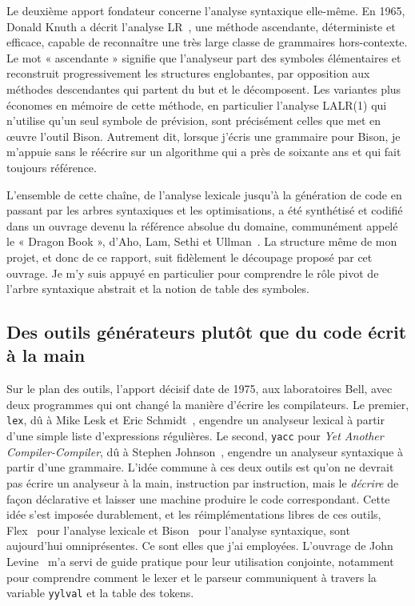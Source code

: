 Le deuxième apport fondateur concerne l'analyse syntaxique elle-même. En 1965,
Donald Knuth a décrit l'analyse LR~\cite{knuth}, une méthode ascendante,
déterministe et efficace, capable de reconnaître une très large classe de
grammaires hors-contexte. Le mot « ascendante » signifie que l'analyseur part des
symboles élémentaires et reconstruit progressivement les structures
englobantes, par opposition aux méthodes descendantes qui partent du but et le
décomposent. Les variantes plus économes en mémoire de cette méthode, en
particulier l'analyse LALR(1) qui n'utilise qu'un seul symbole de prévision, sont
précisément celles que met en \oe uvre l'outil Bison. Autrement dit, lorsque
j'écris une grammaire pour Bison, je m'appuie sans le réécrire sur un algorithme
qui a près de soixante ans et qui fait toujours référence.

L'ensemble de cette chaîne, de l'analyse lexicale jusqu'à la génération de code en
passant par les arbres syntaxiques et les optimisations, a été synthétisé et
codifié dans un ouvrage devenu la référence absolue du domaine, communément appelé
le « Dragon Book », d'Aho, Lam, Sethi et Ullman~\cite{dragon}. La structure même
de mon projet, et donc de ce rapport, suit fidèlement le découpage proposé par cet
ouvrage. Je m'y suis appuyé en particulier pour comprendre le rôle pivot de
l'arbre syntaxique abstrait et la notion de table des symboles.

\subsection{Des outils générateurs plutôt que du code écrit à la main}

Sur le plan des outils, l'apport décisif date de 1975, aux laboratoires Bell, avec
deux programmes qui ont changé la manière d'écrire les compilateurs. Le premier,
\texttt{lex}, dû à Mike Lesk et Eric Schmidt~\cite{lesk}, engendre un analyseur
lexical à partir d'une simple liste d'expressions régulières. Le second,
\texttt{yacc} pour \emph{Yet Another Compiler-Compiler}, dû à Stephen
Johnson~\cite{johnson}, engendre un analyseur syntaxique à partir d'une grammaire.
L'idée commune à ces deux outils est qu'on ne devrait pas écrire un analyseur à la
main, instruction par instruction, mais le \emph{décrire} de façon déclarative et
laisser une machine produire le code correspondant. Cette idée s'est imposée
durablement, et les réimplémentations libres de ces outils, Flex~\cite{flex} pour
l'analyse lexicale et Bison~\cite{bison} pour l'analyse syntaxique, sont
aujourd'hui omniprésentes. Ce sont elles que j'ai employées. L'ouvrage de John
Levine~\cite{levine} m'a servi de guide pratique pour leur utilisation conjointe,
notamment pour comprendre comment le lexer et le parseur communiquent à travers la
variable \texttt{yylval} et la table des tokens.

